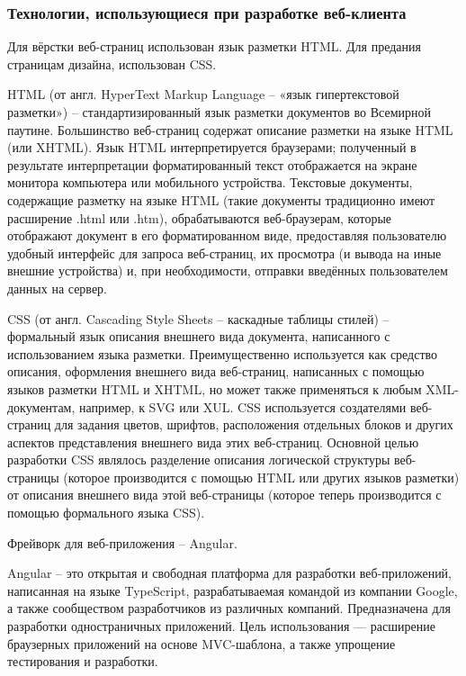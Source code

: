 
\subsubsection{Технологии, использующиеся при разработке веб-клиента}\indent

Для вёрстки веб-страниц использован язык разметки HTML. Для предания страницам дизайна, использован CSS.

HTML (от англ. HyperText Markup Language – «язык гипертекстовой разметки») – стандартизированный язык разметки документов во Всемирной паутине.
Большинство веб-страниц содержат описание разметки на языке HTML (или XHTML).
Язык HTML интерпретируется браузерами;
полученный в результате интерпретации форматированный текст отображается на экране монитора компьютера или мобильного устройства.
Текстовые документы, содержащие разметку на языке HTML (такие документы традиционно имеют расширение .html или .htm), обрабатываются веб-браузерам, которые отображают документ в его форматированном виде, предоставляя пользователю удобный интерфейс для запроса веб-страниц, их просмотра (и вывода на иные внешние устройства) и, при необходимости, отправки введённых пользователем данных на сервер.\cite{web-technologies}

CSS (от англ. Cascading Style Sheets – каскадные таблицы стилей) – формальный язык описания внешнего вида документа, написанного с использованием языка разметки.
Преимущественно используется как средство описания, оформления внешнего вида веб-страниц, написанных с помощью языков разметки HTML и XHTML, но может также применяться к любым XML-документам, например, к SVG или XUL. CSS используется создателями веб-страниц для задания цветов, шрифтов, расположения отдельных блоков и других аспектов представления внешнего вида этих веб-страниц. Основной целью разработки CSS являлось разделение описания логической структуры веб-страницы (которое производится с помощью HTML или других языков разметки) от описания внешнего вида этой веб-страницы (которое теперь производится с помощью формального языка CSS).\cite{web-technologies}

Фрейворк для веб-приложения – Angular.

Angular – это открытая и свободная платформа для разработки веб-приложений, написанная на языке TypeScript, разрабатываемая командой из компании Google, 
а также сообществом разработчиков из различных компаний.
Предназначена для разработки одностраничных приложений.
Цель использования — расширение браузерных приложений на основе MVC-шаблона, а также упрощение тестирования и разработки.

